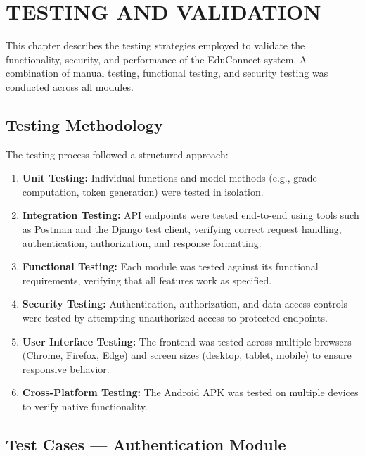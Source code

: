 \newpage
\section{TESTING AND VALIDATION}
\hline

This chapter describes the testing strategies employed to validate the functionality, security, and performance of the EduConnect system. A combination of manual testing, functional testing, and security testing was conducted across all modules.

\subsection{Testing Methodology}

The testing process followed a structured approach:

\begin{enumerate}[label=\arabic*., leftmargin=2em]
    \item \textbf{Unit Testing:} Individual functions and model methods (e.g., grade computation, token generation) were tested in isolation.
    \item \textbf{Integration Testing:} API endpoints were tested end-to-end using tools such as Postman and the Django test client, verifying correct request handling, authentication, authorization, and response formatting.
    \item \textbf{Functional Testing:} Each module was tested against its functional requirements, verifying that all features work as specified.
    \item \textbf{Security Testing:} Authentication, authorization, and data access controls were tested by attempting unauthorized access to protected endpoints.
    \item \textbf{User Interface Testing:} The frontend was tested across multiple browsers (Chrome, Firefox, Edge) and screen sizes (desktop, tablet, mobile) to ensure responsive behavior.
    \item \textbf{Cross-Platform Testing:} The Android APK was tested on multiple devices to verify native functionality.
\end{enumerate}

\subsection{Test Cases --- Authentication Module}

